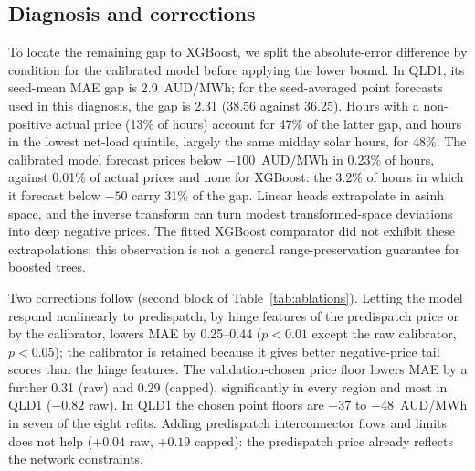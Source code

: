 \documentclass[preprint,12pt]{elsarticle}
\begin{document}
\begin{table}[t]
\centering
\caption{Three-region mean test MAE across settings: static split, quarterly refit, quarterly refit with predispatch (PD). Means over three seeds; best per column in bold. Ours is the linear base with the dual fields; in the last setting it also includes the calibrator and the price floor.}
\label{tab:settings}
\small

\end{table}

\begin{table}[t]
\centering
\caption{Ablations. Pooled Diebold--Mariano differences (negative is better). The first block compares the dual fields with the same linear base in each setting; each row of the second block is compared with the model it modifies. MAE averages seed losses; CRPS scores seed-averaged quantiles. These pooled tests do not imply improvement in every region. $^{*}p<0.05$, $^{**}p<0.01$.}
\label{tab:ablations}
\small
\resizebox{\textwidth}{!}{}
\end{table}

\subsection{Diagnosis and corrections}
\label{sec:diagnosis}
To locate the remaining gap to XGBoost, we split the absolute-error difference by condition for the calibrated model before applying the lower bound. In QLD1, its seed-mean MAE gap is 2.9~AUD/MWh; for the seed-averaged point forecasts used in this diagnosis, the gap is 2.31 (38.56 against 36.25). Hours with a non-positive actual price (13\% of hours) account for 47\% of the latter gap, and hours in the lowest net-load quintile, largely the same midday solar hours, for 48\%. The calibrated model forecast prices below $-100$~AUD/MWh in 0.23\% of hours, against 0.01\% of actual prices and none for XGBoost: the 3.2\% of hours in which it forecast below $-50$ carry 31\% of the gap. Linear heads extrapolate in asinh space, and the inverse transform can turn modest transformed-space deviations into deep negative prices. The fitted XGBoost comparator did not exhibit these extrapolations; this observation is not a general range-preservation guarantee for boosted trees.

Two corrections follow (second block of Table~\ref{tab:ablations}). Letting the model respond nonlinearly to predispatch, by hinge features of the predispatch price or by the calibrator, lowers MAE by 0.25--0.44 ($p<0.01$ except the raw calibrator, $p<0.05$); the calibrator is retained because it gives better negative-price tail scores than the hinge features. The validation-chosen price floor lowers MAE by a further 0.31 (raw) and 0.29 (capped), significantly in every region and most in QLD1 ($-0.82$ raw). In QLD1 the chosen point floors are $-37$ to $-48$~AUD/MWh in seven of the eight refits. Adding predispatch interconnector flows and limits does not help ($+0.04$ raw, $+0.19$ capped): the predispatch price already reflects the network constraints.
\end{document}
